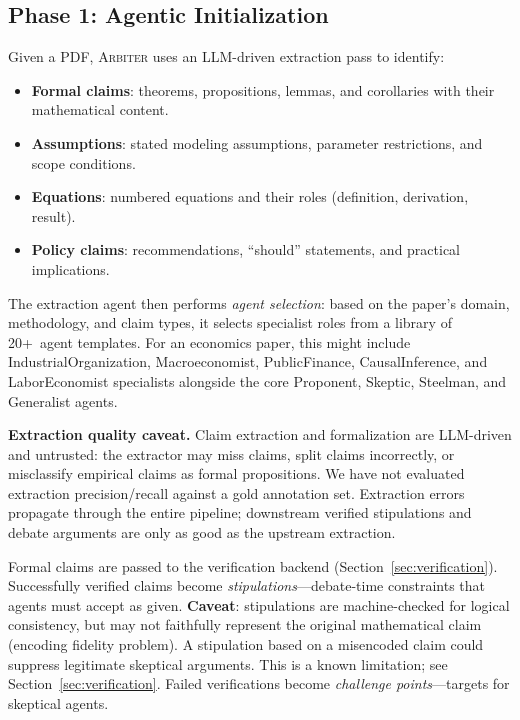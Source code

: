 \documentclass[11pt]{article}
\newcommand{\arbiter}{\textsc{Arbiter}}
\begin{document}
\subsection{Phase 1: Agentic Initialization}

Given a PDF, \arbiter{} uses an LLM-driven extraction pass to identify:
\begin{itemize}[leftmargin=*,itemsep=1pt]
\item \textbf{Formal claims}: theorems, propositions, lemmas, and corollaries with their mathematical content.
\item \textbf{Assumptions}: stated modeling assumptions, parameter restrictions, and scope conditions.
\item \textbf{Equations}: numbered equations and their roles (definition, derivation, result).
\item \textbf{Policy claims}: recommendations, ``should'' statements, and practical implications.
\end{itemize}

The extraction agent then performs \emph{agent selection}: based on the paper's domain, methodology, and claim types, it selects specialist roles from a library of 20+~agent templates.
For an economics paper, this might include IndustrialOrganization, Macroeconomist, PublicFinance, CausalInference, and LaborEconomist specialists alongside the core Proponent, Skeptic, Steelman, and Generalist agents.

\noindent\textbf{Extraction quality caveat.} Claim extraction and formalization are LLM-driven and untrusted: the extractor may miss claims, split claims incorrectly, or misclassify empirical claims as formal propositions. We have not evaluated extraction precision/recall against a gold annotation set. Extraction errors propagate through the entire pipeline; downstream verified stipulations and debate arguments are only as good as the upstream extraction.

Formal claims are passed to the verification backend (Section~\ref{sec:verification}).
Successfully verified claims become \emph{stipulations}---debate-time constraints that agents must accept as given.
\textbf{Caveat}: stipulations are machine-checked for logical consistency, but may not faithfully represent the original mathematical claim (encoding fidelity problem). A stipulation based on a misencoded claim could suppress legitimate skeptical arguments. This is a known limitation; see Section~\ref{sec:verification}.
Failed verifications become \emph{challenge points}---targets for skeptical agents.
\end{document}
